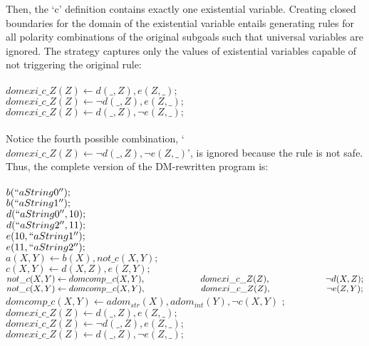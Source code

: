 Then, the `c' definition contains exactly one existential variable. Creating closed boundaries for the domain of the existential variable entails generating rules for all polarity combinations of the original subgoals such that universal variables are ignored. The strategy captures only the values of existential variables capable of not triggering the original rule:
\\ \\
$domexi\_c\_Z( Z ) \leftarrow d( \_, Z ), e( Z, \_ ) ; $\\
$domexi\_c\_Z( Z ) \leftarrow \neg d( \_, Z ), e( Z, \_ ) ; $\\
$domexi\_c\_Z( Z ) \leftarrow d( \_, Z ), \neg e( Z, \_ ) ; $\\
\\

Notice the fourth possible combination, `$domexi\_c\_Z( Z ) \leftarrow \neg d( \_, Z ), \neg e( Z, \_ )$', is ignored because the rule is not safe. Thus, the complete version of the DM-rewritten program is:
\\ \\
$b( ``aString0'' ) ;$ \\
$b( ``aString1'' ) ; $\\
$d( ``aString0'', 10 ) ; $\\
$d( ``aString2'', 11 ) ; $\\
$e( 10, ``aString1'' ) ; $\\
$e( 11, ``aString2'' ) ; $\\
$a( X, Y ) \leftarrow  b( X ), not\_c( X, Y ) ; $\\
$c( X, Y ) \leftarrow d( X, Z ), e( Z, Y ) ; $ \\
$not\_c( X, Y ) \leftarrow domcomp\_c( X, Y ), \\
\-\hspace{2.2cm} domexi\_c\_Z(Z), \\
\-\hspace{2.2cm} \neg d( X, Z ) ; $ \\
$not\_c( X, Y ) \leftarrow domcomp\_c( X, Y ), \\
\-\hspace{2.2cm} domexi\_c\_Z(Z), \\
\-\hspace{2.2cm} \neg e( Z, Y ) ; $ \\
$domcomp\_c(X,Y) \leftarrow adom_{str}(X), adom_{int}(Y), \neg c( X, Y )$ ;
$domexi\_c\_Z( Z ) \leftarrow d( \_, Z ), e( Z, \_ ) ; $\\
$domexi\_c\_Z( Z ) \leftarrow \neg d( \_, Z ), e( Z, \_ ) ; $\\
$domexi\_c\_Z( Z ) \leftarrow d( \_, Z ), \neg e( Z, \_ ) ; $\\
\\


